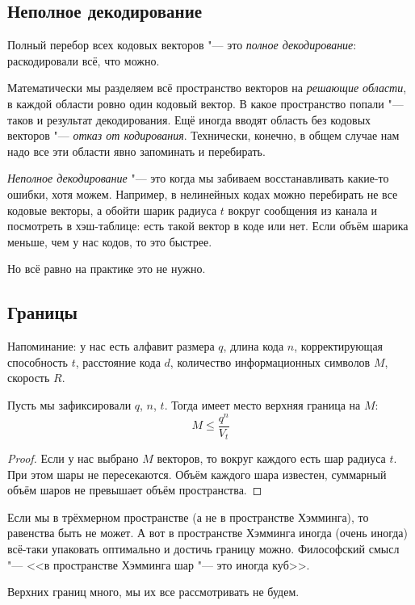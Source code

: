 \subsection{Неполное декодирование}
Полный перебор всех кодовых векторов "--- это \textit{полное декодирование}:
раскодировали всё, что можно.

Математически мы разделяем всё пространство векторов на \textit{решающие области},
в каждой области ровно один кодовый вектор.
В какое пространство попали "--- таков и результат декодирования.
Ещё иногда вводят область без кодовых векторов "--- \textit{отказ от кодирования}.
Технически, конечно, в общем случае нам надо все эти области явно запоминать и перебирать.

\textit{Неполное декодирование} "--- это когда мы забиваем восстанавливать
какие-то ошибки, хотя можем.
Например, в нелинейных кодах можно перебирать не все кодовые векторы,
а обойти шарик радиуса $t$ вокруг сообщения из канала и посмотреть в хэш-таблице:
есть такой вектор в коде или нет.
Если объём шарика меньше, чем у нас кодов, то это быстрее.

Но всё равно на практике это не нужно.

\subsection{Границы}
Напоминание: у нас есть алфавит размера $q$, длина кода $n$,
корректирующая способность $t$, расстояние кода $d$,
количество информационных символов $M$, скорость $R$.

\begin{lemma}
Пусть мы зафиксировали $q$, $n$, $t$.
Тогда имеет место верхняя граница на $M$:
\[
	M \le \frac{q^n}{V_t}
\]
\end{lemma}
\begin{proof}
	Если у нас выбрано $M$ векторов, то вокруг каждого
	есть шар радиуса $t$.
	При этом шары не пересекаются.
	Объём каждого шара известен, суммарный объём шаров
	не превышает объём пространства.
\end{proof}

\begin{Rem}
	Если мы в трёхмерном пространстве (а не в пространстве Хэмминга),
	то равенства быть не может.
	А вот в пространстве Хэмминга иногда (очень иногда) всё-таки
	упаковать оптимально и достичь границу можно.
	Философский смысл "--- <<в пространстве Хэмминга шар "--- это иногда куб>>.
\end{Rem}
\begin{Rem}
	Верхних границ много, мы их все рассмотривать не будем.
\end{Rem}

